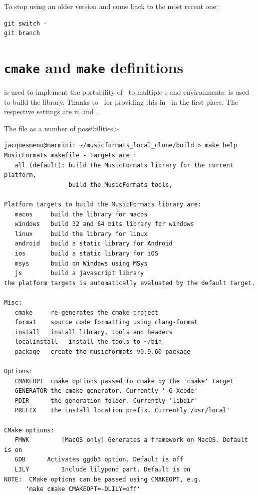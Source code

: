 To stop using an older version and come back to the most recent one:
\begin{lstlisting}[language=Terminal]
git switch -
git branch
\end{lstlisting}


\section{{\tt cmake} and {\tt make} definitions}

 is used to implement the portability of \mf\ to multiple \OS s and environments.  is used to build the library. Thanks to \fober\ for providing this in \libmusicxml\ in the first place.
The respective settings are in  and .

The  file as a number of possibilities>
\begin{lstlisting}[language=Terminal]
jacquesmenu@macmini: ~/musicformats_local_clone/build > make help
MusicFormats makefile - Targets are :
   all (default): build the MusicFormats library for the current platform,
                  build the MusicFormats tools,

Platform targets to build the MusicFormats library are:
   macos     build the library for macos
   windows   build 32 and 64 bits library for windows
   linux     build the library for linux
   android   build a static library for Android
   ios       build a static library for iOS
   msys      build on Windows using MSys
   js        build a javascript library
the platform targets is automatically evaluated by the default target.

Misc:
   cmake     re-generates the cmake project
   format    source code formatting using clang-format
   install   install library, tools and headers
   localinstall   install the tools to ~/bin
   package   create the musicformats-v0.9.60 package

Options:
   CMAKEOPT  cmake options passed to cmake by the 'cmake' target
   GENERATOR the cmake generator. Currently '-G Xcode'
   PDIR      the generation folder. Currently 'libdir'
   PREFIX    the install location prefix. Currently /usr/local'

CMake options:
   FMWK 		[MacOS only] Generates a framework on MacOS. Default is on
   GDB 		Activates ggdb3 option. Default is off
   LILY 		Include lilypond part. Default is on
NOTE:  CMake options can be passed using CMAKEOPT, e.g.
      'make cmake CMAKEOPT=-DLILY=off'
\end{lstlisting}


